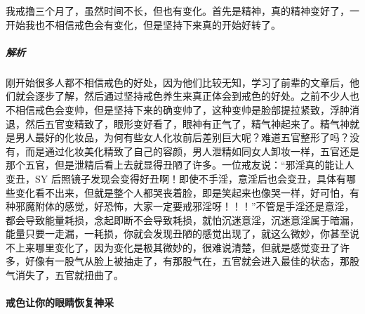 \begin{case}
    我戒撸三个月了，虽然时间不长，但也有变化。首先是精神，真的精神变好了，一开始我也不相信戒色会有变化，但是坚持下来真的开始好转了。
    \subparagraph{解析} 刚开始很多人都不相信戒色的好处，因为他们比较无知，学习了前辈的文章后，他们就会逐步了解，然后通过坚持戒色养生来真正体会到戒色的好处。之前不少人也不相信戒色会变帅，但是坚持下来的确变帅了，这种变帅是脸部提拉紧致，浮肿消退，然后五官变精致了，眼形变好看了，眼神有正气了，精气神起来了。精气神就是男人最好的化妆品，为何有些女人化妆前后差别巨大呢？难道五官整形了吗？没有，而是通过化妆美化精致了自己的容颜，男人泄精如同女人卸妆一样，五官还是那个五官，但是泄精后看上去就显得丑陋了许多。一位戒友说：“邪淫真的能让人变丑，SY 后照镜子发现会变得好丑啊！即使不手淫，意淫后也会变丑，具体有哪些变化看不出来，但就是整个人都哭丧着脸，即是笑起来也像哭一样，好可怕，有种邪魔附体的感觉，好恐怖，大家一定要戒邪淫呀！！！”不管是手淫还是意淫，都会导致能量耗损，念起即断不会导致耗损，就怕沉迷意淫，沉迷意淫属于暗漏，能量只要一走漏，一耗损，你就会发现丑陋的感觉出现了，就这么微妙，你甚至说不上来哪里变化了，因为变化是极其微妙的，很难说清楚，但就是感觉变丑了许多，好像有一股气从脸上被抽走了，有那股气在，五官就会进入最佳的状态，那股气消失了，五官就扭曲了。
\end{case}

\paragraph{戒色让你的眼睛恢复神采}

